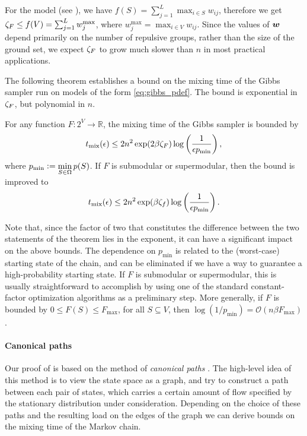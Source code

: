 For the \flid{} model (see ), we have $f(S) = \sum_{j=1}^L \max_{i \in S} w_{ij}$, therefore we get $\zeta_F \leq f(V) = \sum_{j=1}^L w_j^{\mathrm{max}}$, where $w_j^{\mathrm{max}} = \max_{i \in V} w_{ij}$.
Since the values of $\bm{w}$ depend primarily on the number of repulsive groups, rather than the size of the ground set, we expect $\zeta_F$ to grow much slower than $n$ in most practical applications.

\vspace{1.5em}
\noindent The following theorem establishes a bound on the mixing time of the Gibbs sampler run on models of the form \eqref{eq:gibbs_pdef}.
The bound is exponential in $\zeta_F$, but polynomial in $n$.
\begin{theorem} \label{thm:poly}
  For any function $F : 2^V \to \mathbb{R}$, the mixing time of the Gibbs sampler is bounded by
  \begin{align*}
    t_{\mathrm{mix}}(\epsilon) \leq 2n^2 \exp(2 \beta \zeta_F) \log\left(\frac{1}{\epsilon p_{\min}}\right),
  \end{align*}
  where $p_{\min} \vcentcolon= \displaystyle\min_{S \in \Omega}p(S)$.
  If $F$ is submodular or supermodular, then the bound is improved to
  \begin{align*}
    t_{\mathrm{mix}}(\epsilon) \leq 2n^2 \exp(\beta \zeta_f) \log\left(\frac{1}{\epsilon p_{\min}}\right).
  \end{align*}
\end{theorem}
Note that, since the factor of two that constitutes the difference between the two statements of the theorem lies in the exponent, it can have a significant impact on the above bounds.
The dependence on $p_{\min}$ is related to the (worst-case) starting state of the chain, and can be eliminated if we have a way to guarantee a high-probability starting state.
If $F$ is submodular or supermodular, this is usually straightforward to accomplish by using one of the standard constant-factor optimization algorithms \citep{nemhauser78,fujishige05} as a preliminary step.
More generally, if $F$ is bounded by $0 \leq F(S) \leq F_{\max}$, for all $S \subseteq V$, then $\log (1/p_{\min}) = \mathcal{O}(n \beta F_{\max})$.

\paragraph{Canonical paths}
Our proof of  is based on the method of \emph{canonical paths} \citep{jerrum03,sinclair92,jerrum89,diaconis91}.
The high-level idea of this method is to view the state space as a graph, and try to construct a path between each pair of states, which carries a certain amount of flow specified by the stationary distribution under consideration.
Depending on the choice of these paths and the resulting load on the edges of the graph we can derive bounds on the mixing time of the Markov chain.

